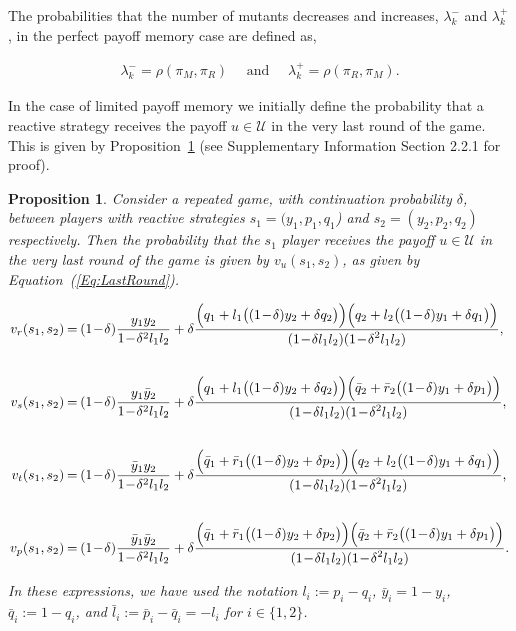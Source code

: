 \documentclass[11pt]{article}
\theoremstyle{plainCl1}
\newtheorem{Prop}{Proposition}
\theoremstyle{plainCl2}
\begin{document}
The probabilities that the number of mutants decreases and increases,
\(\lambda^-_k\) and \(\lambda^+_k\), in the perfect payoff memory case are
defined as,

\begin{align}\label{eq:perfect_memory_lambdas}
  \lambda^-_k \!=\!\rho(\pi_M, \pi_R) \quad \text{ and } \quad \lambda^+_k \!=\!\rho(\pi_R, \pi_M).
\end{align}

In the case of limited payoff memory we initially define the probability that a
reactive strategy receives the payoff $u\!\in\! \mathcal{U}$ in the very last
round of the game. This is given by Proposition~\ref{proposition:last_round}
(see Supplementary Information Section 2.2.1 for proof).

\begin{Prop}\label{proposition:last_round} Consider a repeated game, with
continuation probability $\delta$, between players with reactive strategies
$s_1\!=\!(y_1, p_1, q_1$)  and $s_2\!=\!(y_2,p_2,q_2)$ respectively. Then
the probability that the $s_1$ player receives the payoff $u\!\in\!
\mathcal{U}$ in the very last round of the game is given by
$v_{u}(s_1,s_2)$, as given by Equation~(\ref{Eq:LastRound}).

\begin{equation} \label{Eq:LastRound}
  \setlength{\arraycolsep}{1pt}
  \begin{array}{rcl}

  v_{r}(s_1,s_2) &= &\displaystyle (1\!-\!\delta)\frac{y_1y_2}{1\!-\!\delta^2 l_1 l_2}+\delta \frac{\Big(q_1+l_1\big((1\!-\!\delta)y_2+\delta q_2\big)\Big) \Big(q_2+l_2\big((1\!-\!\delta)y_1+\delta q_1\big)\Big)}
  {\displaystyle(1\!-\!\delta l_1l_2)(1\!-\!\delta^2 l_1 l_2)},\\[1cm]

  v_{s}(s_1,s_2) &= &\displaystyle (1\!-\!\delta)\frac{y_1\bar{y}_2}{1\!-\!\delta^2 l_1 l_2}+\delta \frac{\Big(q_1+l_1\big((1\!-\!\delta)y_2+\delta q_2\big)\Big) \Big(\bar{q}_2+\bar{r}_2\big((1\!-\!\delta)y_1+\delta p_1\big)\Big)}
  {\displaystyle(1\!-\!\delta l_1l_2)(1\!-\!\delta^2 l_1 l_2)},\\[1cm]

  v_{t}(s_1,s_2) &= &\displaystyle (1\!-\!\delta)\frac{\bar{y}_1y_2}{1\!-\!\delta^2 l_1 l_2}+\delta \frac{\Big(\bar{q}_1+\bar{r}_1\big((1\!-\!\delta)y_2+\delta p_2\big)\Big) \Big(q_2+l_2\big((1\!-\!\delta)y_1+\delta q_1\big)\Big)}
  {\displaystyle(1\!-\!\delta l_1l_2)(1\!-\!\delta^2 l_1 l_2)},\\[1cm]

  v_{p}(s_1,s_2) &= &\displaystyle (1\!-\!\delta)\frac{\bar{y}_1\bar{y}_2}{1\!-\!\delta^2 l_1 l_2}+\delta \frac{\Big(\bar{q}_1+\bar{r}_1\big((1\!-\!\delta)y_2+\delta p_2\big)\Big) \Big(\bar{q}_2+\bar{r}_2\big((1\!-\!\delta)y_1+\delta p_1\big)\Big)}
  {\displaystyle(1\!-\!\delta l_1l_2)(1\!-\!\delta^2 l_1 l_2)}.
  \end{array}
\end{equation}

In these expressions, we have used the notation $l_i:=p_i\!-\!q_i$,
$\bar{y}_i\!=\!1\!-\!y_i$, $\bar{q}_i:=1\!-\!q_i$, and
$\bar{l}_i:=\bar{p}_i\!-\!\bar{q}_i=-l_i$ for $i\!\in\!\{1,2\}$.
\end{Prop}
\end{document}
